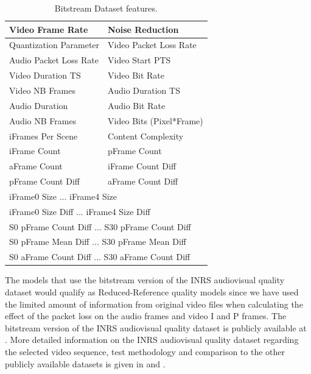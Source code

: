 \documentclass[journal]{IEEEtran}
\begin{document}
\begin{table}
\centering
\caption{Bitstream Dataset features.}
\label{tab:parameters}
\begin{tabular}{|l|l|} \hline
Video Frame Rate & Noise Reduction \\ \hline
Quantization Parameter &  Video Packet Loss Rate \\ \hline
Audio Packet Loss Rate & Video Start PTS \\ \hline
Video Duration TS & Video Bit Rate \\ \hline
Video NB Frames & Audio Duration TS \\ \hline
Audio Duration & Audio Bit Rate \\ \hline
Audio NB Frames & Video Bits (Pixel*Frame) \\ \hline
iFrames Per Scene & Content Complexity \\ \hline
iFrame Count & pFrame Count \\ \hline
aFrame Count & iFrame Count Diff \\ \hline
pFrame Count Diff & aFrame Count Diff \\ \hline
\multicolumn{2}{|l|}{iFrame0 Size ... iFrame4 Size } \\ \hline
\multicolumn{2}{|l|}{iFrame0 Size Diff ... iFrame4 Size Diff } \\ \hline
\multicolumn{2}{|l|}{S0 pFrame Count Diff ... S30 pFrame Count Diff } \\ \hline
\multicolumn{2}{|l|}{S0 pFrame Mean Diff ... S30 pFrame Mean Diff } \\ \hline
\multicolumn{2}{|l|}{S0 aFrame Count Diff ... S30 aFrame Count Diff } \\ \hline
\end{tabular}
\end{table}

The models that use the bitstream version of the INRS audiovisual quality dataset would qualify as Reduced-Reference quality models since we have used the limited amount of information from original video files when calculating the effect of the packet loss on the audio frames and video I and P frames. The bitstream version of the INRS audiovisual quality dataset is publicly available at \cite{demirbilek2016githubINRSdataset}. More detailed information on the INRS audiovisual quality dataset regarding the selected video sequence, test methodology and comparison to the other publicly available datasets is given in \cite{demirbilek2017parametricmodels} and \cite{demirbilek2016inrsquality}. 
\end{document}
